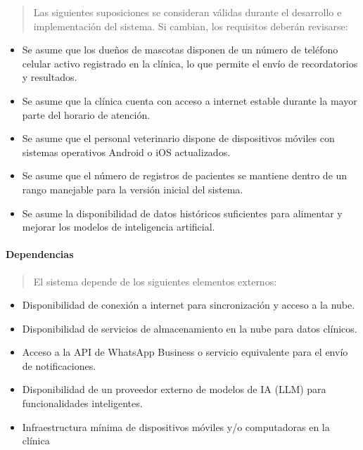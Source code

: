 \documentclass[
]{article}
\begin{document}
\begin{quote}
Las siguientes suposiciones se consideran válidas durante el desarrollo
e implementación del sistema. Si cambian, los requisitos deberán
revisarse:
\end{quote}

\begin{itemize}
\item
  Se asume que los dueños de mascotas disponen de un número de teléfono
  celular activo registrado en la clínica, lo que permite el envío de
  recordatorios y resultados.
\item
  Se asume que la clínica cuenta con acceso a internet estable durante
  la mayor parte del horario de atención.
\item
  Se asume que el personal veterinario dispone de dispositivos móviles
  con sistemas operativos Android o iOS actualizados.
\item
  Se asume que el número de registros de pacientes se mantiene dentro de
  un rango manejable para la versión inicial del sistema.
\item
  Se asume la disponibilidad de datos históricos suficientes para
  alimentar y mejorar los modelos de inteligencia artificial.
\end{itemize}

\paragraph{Dependencias}\label{dependencias}

\begin{quote}
El sistema depende de los siguientes elementos externos:
\end{quote}

\begin{itemize}
\item
  Disponibilidad de conexión a internet para sincronización y acceso a
  la nube.
\item
  Disponibilidad de servicios de almacenamiento en la nube para datos
  clínicos.
\item
  Acceso a la API de WhatsApp Business o servicio equivalente para el
  envío de notificaciones.
\item
  Disponibilidad de un proveedor externo de modelos de IA (LLM) para
  funcionalidades inteligentes.
\item
  Infraestructura mínima de dispositivos móviles y/o computadoras en la
  clínica
\end{itemize}
\end{document}
